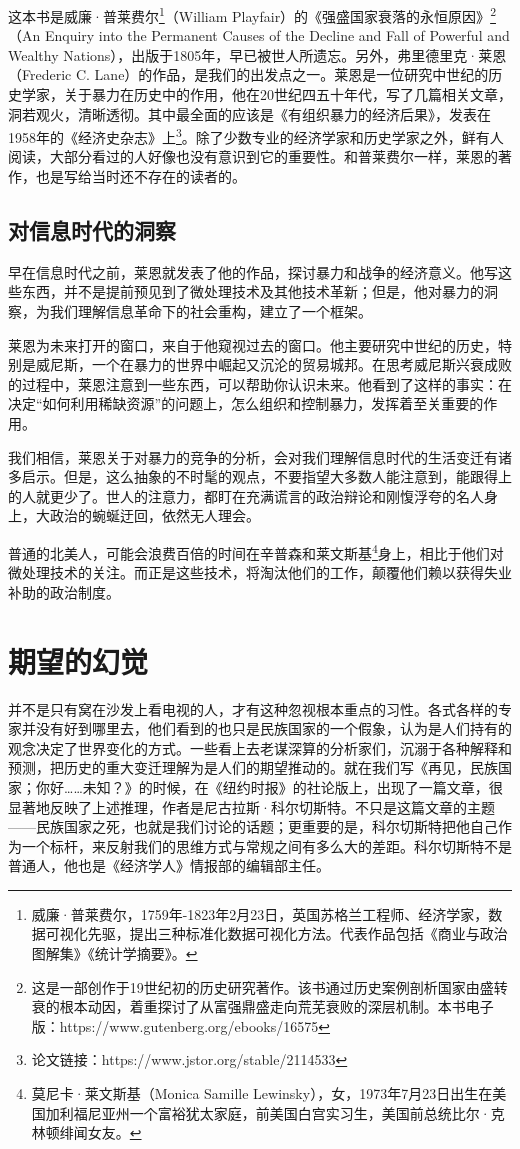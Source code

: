 这本书是威廉·普莱费尔\footnote{威廉·普莱费尔，1759年-1823年2月23日，英国苏格兰工程师、经济学家，数据可视化先驱，提出三种标准化数据可视化方法。代表作品包括《商业与政治图解集》《统计学摘要》。}（William Playfair）的《强盛国家衰落的永恒原因》\footnote{这是一部创作于19世纪初的历史研究著作。该书通过历史案例剖析国家由盛转衰的根本动因，着重探讨了从富强鼎盛走向荒芜衰败的深层机制。本书电子版：https://www.gutenberg.org/ebooks/16575}（An Enquiry into the Permanent Causes of the Decline and Fall of Powerful and Wealthy Nations），出版于1805年，早已被世人所遗忘。另外，弗里德里克·莱恩（Frederic C. Lane）的作品，是我们的出发点之一。莱恩是一位研究中世纪的历史学家，关于暴力在历史中的作用，他在20世纪四五十年代，写了几篇相关文章，洞若观火，清晰透彻。其中最全面的应该是《有组织暴力的经济后果》，发表在1958年的《经济史杂志》上\footnote{论文链接：https://www.jstor.org/stable/2114533}。除了少数专业的经济学家和历史学家之外，鲜有人阅读，大部分看过的人好像也没有意识到它的重要性。和普莱费尔一样，莱恩的著作，也是写给当时还不存在的读者的。


\subsection{对信息时代的洞察}
早在信息时代之前，莱恩就发表了他的作品，探讨暴力和战争的经济意义。他写这些东西，并不是提前预见到了微处理技术及其他技术革新；但是，他对暴力的洞察，为我们理解信息革命下的社会重构，建立了一个框架。


莱恩为未来打开的窗口，来自于他窥视过去的窗口。他主要研究中世纪的历史，特别是威尼斯，一个在暴力的世界中崛起又沉沦的贸易城邦。在思考威尼斯兴衰成败的过程中，莱恩注意到一些东西，可以帮助你认识未来。他看到了这样的事实：在决定“如何利用稀缺资源”的问题上，怎么组织和控制暴力，发挥着至关重要的作用。


我们相信，莱恩关于对暴力的竞争的分析，会对我们理解信息时代的生活变迁有诸多启示。但是，这么抽象的不时髦的观点，不要指望大多数人能注意到，能跟得上的人就更少了。世人的注意力，都盯在充满谎言的政治辩论和刚愎浮夸的名人身上，大政治的蜿蜒迂回，依然无人理会。


普通的北美人，可能会浪费百倍的时间在辛普森和莱文斯基\footnote{莫尼卡·莱文斯基（Monica Samille Lewinsky），女，1973年7月23日出生在美国加利福尼亚州一个富裕犹太家庭，前美国白宫实习生，美国前总统比尔·克林顿绯闻女友。}身上，相比于他们对微处理技术的关注。而正是这些技术，将淘汰他们的工作，颠覆他们赖以获得失业补助的政治制度。


\section{期望的幻觉}
并不是只有窝在沙发上看电视的人，才有这种忽视根本重点的习性。各式各样的专家并没有好到哪里去，他们看到的也只是民族国家的一个假象，认为是人们持有的观念决定了世界变化的方式。一些看上去老谋深算的分析家们，沉溺于各种解释和预测，把历史的重大变迁理解为是人们的期望推动的。就在我们写《再见，民族国家；你好……未知？》的时候，在《纽约时报》的社论版上，出现了一篇文章，很显著地反映了上述推理，作者是尼古拉斯·科尔切斯特。不只是这篇文章的主题——民族国家之死，也就是我们讨论的话题；更重要的是，科尔切斯特把他自己作为一个标杆，来反射我们的思维方式与常规之间有多么大的差距。科尔切斯特不是普通人，他也是《经济学人》情报部的编辑部主任。


